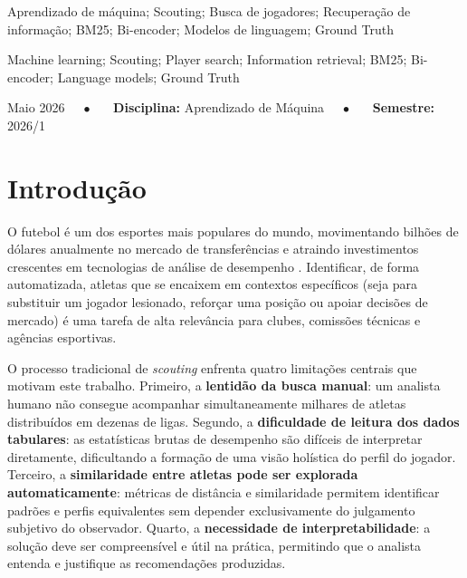 \documentclass[portuguese]{sbc2025}
\begin{document}
\begin{frontmatter}
\begin{pchaves}
Aprendizado de máquina; Scouting; Busca de jogadores; Recuperação de informação;
BM25; Bi-encoder; Modelos de linguagem; Ground Truth
\end{pchaves}

\begin{keywords}
Machine learning; Scouting; Player search; Information retrieval;
BM25; Bi-encoder; Language models; Ground Truth
\end{keywords}

\begin{dates}
 Maio 2026~~~$\bullet$~~~
{\sffamily\textbf{Disciplina:}} Aprendizado de Máquina~~~$\bullet$~~~
{\sffamily\textbf{Semestre:}} 2026/1
\end{dates}

\end{frontmatter}

\section{Introdução}
\label{sec:intro}

O futebol é um dos esportes mais populares do mundo, movimentando bilhões de dólares
anualmente no mercado de transferências e atraindo investimentos crescentes em
tecnologias de análise de desempenho \citep{delatorre2021}. Identificar, de forma
automatizada, atletas que se encaixem em contextos específicos (seja para substituir
um jogador lesionado, reforçar uma posição ou apoiar decisões de mercado) é uma
tarefa de alta relevância para clubes, comissões técnicas e agências esportivas.

O processo tradicional de \textit{scouting} enfrenta quatro limitações centrais que
motivam este trabalho. Primeiro, a \textbf{lentidão da busca manual}: um analista
humano não consegue acompanhar simultaneamente milhares de atletas distribuídos em
dezenas de ligas. Segundo, a \textbf{dificuldade de leitura dos dados tabulares}: as
estatísticas brutas de desempenho são difíceis de interpretar diretamente, dificultando
a formação de uma visão holística do perfil do jogador. Terceiro, a
\textbf{similaridade entre atletas pode ser explorada automaticamente}: métricas de
distância e similaridade permitem identificar padrões e perfis equivalentes sem
depender exclusivamente do julgamento subjetivo do observador. Quarto, a
\textbf{necessidade de interpretabilidade}: a solução deve ser compreensível e útil
na prática, permitindo que o analista entenda e justifique as recomendações produzidas.
\end{document}

